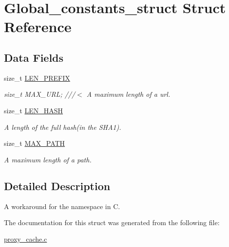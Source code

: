 \hypertarget{struct_global__constants__struct}{}\section{Global\+\_\+constants\+\_\+struct Struct Reference}
\label{struct_global__constants__struct}
\subsection*{Data Fields}
\begin{DoxyCompactItemize}
\item 
size\+\_\+t \hyperlink{struct_global__constants__struct_a80c378e13943773fedfcb0391c8f3673}{L\+E\+N\+\_\+\+P\+R\+E\+F\+IX}\hypertarget{struct_global__constants__struct_a80c378e13943773fedfcb0391c8f3673}{}\label{struct_global__constants__struct_a80c378e13943773fedfcb0391c8f3673}

\begin{DoxyCompactList}\small\item\em size\+\_\+t M\+A\+X\+\_\+\+U\+RL; ///$<$ A maximum length of a url. \end{DoxyCompactList}\item 
size\+\_\+t \hyperlink{struct_global__constants__struct_a463a903125698a4e3d84891713d05df6}{L\+E\+N\+\_\+\+H\+A\+SH}\hypertarget{struct_global__constants__struct_a463a903125698a4e3d84891713d05df6}{}\label{struct_global__constants__struct_a463a903125698a4e3d84891713d05df6}

\begin{DoxyCompactList}\small\item\em A length of the full hash(in the S\+H\+A1). \end{DoxyCompactList}\item 
size\+\_\+t \hyperlink{struct_global__constants__struct_a56d8dfb5abccf20d04a1541e701d1957}{M\+A\+X\+\_\+\+P\+A\+TH}\hypertarget{struct_global__constants__struct_a56d8dfb5abccf20d04a1541e701d1957}{}\label{struct_global__constants__struct_a56d8dfb5abccf20d04a1541e701d1957}

\begin{DoxyCompactList}\small\item\em A maximum length of a path. \end{DoxyCompactList}\end{DoxyCompactItemize}


\subsection{Detailed Description}
A workaround for the namespace in C. 

The documentation for this struct was generated from the following file\+:\begin{DoxyCompactItemize}
\item 
\hyperlink{proxy__cache_8c}{proxy\+\_\+cache.\+c}\end{DoxyCompactItemize}
